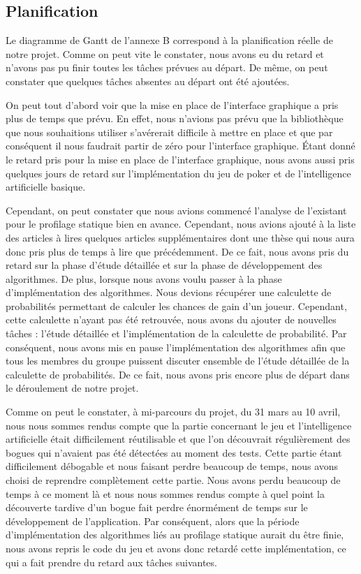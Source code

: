 \documentclass{report}
\begin{document}
\subsection{Planification}
\hspace{0.5cm}Le diagramme de Gantt de l'annexe B correspond à la planification réelle de notre projet. Comme on peut vite le constater, nous avons eu du retard et n'avons pas pu finir toutes les tâches prévues au départ. De même, on peut constater que quelques tâches absentes au départ ont été ajoutées.\par

On peut tout d'abord voir que la mise en place de l'interface graphique a pris plus de temps que prévu. En effet, nous n'avions pas prévu que la bibliothèque que nous souhaitions utiliser s’avérerait difficile à mettre en place et que par conséquent il nous faudrait partir de zéro pour l'interface graphique. Étant donné le retard pris pour la mise en place de l'interface graphique, nous avons aussi pris quelques jours de retard sur l'implémentation du jeu de poker et de l'intelligence artificielle basique. \par
Cependant, on peut constater que nous avions commencé l'analyse de l'existant pour le profilage statique bien en avance. Cependant, nous avions ajouté à la liste des articles à lires quelques articles supplémentaires dont une thèse qui nous aura donc pris plus de temps à lire que précédemment. De ce fait, nous avons pris du retard sur la phase d'étude détaillée et sur la phase de développement des algorithmes. De plus, lorsque nous avons voulu passer à la phase d'implémentation des algorithmes. Nous devions récupérer une calculette de probabilités permettant de calculer les chances de gain d'un joueur. Cependant, cette calculette n'ayant pas été retrouvée, nous avons du ajouter de nouvelles tâches : l'étude détaillée et l'implémentation de la calculette de probabilité. Par conséquent, nous avons mis en pause l'implémentation des algorithmes afin que tous les membres du groupe puissent discuter ensemble de l'étude détaillée de la calculette de probabilités. De ce fait, nous avons pris encore plus de départ dans le déroulement de notre projet. \par

Comme on peut le constater, à mi-parcours du projet, du 31 mars au 10 avril, nous nous sommes rendus compte que la partie concernant le jeu et l'intelligence artificielle était difficilement réutilisable et que l'on découvrait régulièrement des bogues qui n'avaient pas été détectées au moment des tests. Cette partie étant difficilement débogable et nous faisant perdre beaucoup de temps, nous avons choisi de reprendre complètement cette partie. Nous avons perdu beaucoup de temps à ce moment là et nous nous sommes rendus compte à quel point la découverte tardive d'un bogue fait perdre énormément de temps sur le développement de l'application. Par conséquent, alors que la période d'implémentation des algorithmes liés au profilage statique aurait du être finie, nous avons repris le code du jeu et avons donc retardé cette implémentation, ce qui a fait prendre du retard aux tâches suivantes.\par
\end{document}
